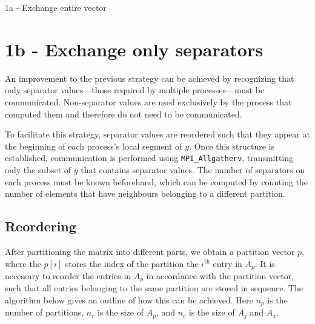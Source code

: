 \begin{algorithm}[H]
    \caption{1a - Exchange entire vector}
    \SetAlgoVlined


\end{algorithm}

\section{1b - Exchange only separators}

An improvement to the previous strategy can be achieved by recognizing that only separator values—those required by multiple processes—must be communicated. Non-separator values are used exclusively by the process that computed them and therefore do not need to be communicated.

To facilitate this strategy, separator values are reordered such that they appear at the beginning of each process's local segment of \(y\). Once this structure is established, communication is performed using \texttt{MPI\_Allgatherv}, transmitting only the subset of \(y\) that contains separator values. The number of separators on each process must be known beforehand, which can be computed by counting the number of elements that have neighbours belonging to a different partition.


\subsection{Reordering}
After partitioning the matrix into different parts, we obtain a partition vector \(p\), where the \(p[i]\) stores the index of the partition the \(i^{\text{th}}\) entry in \(A_{p}\). It is necessary to reorder the entries in \(A_{p}\) in accordance with the partition vector, such that all entries belonging to the same partition are stored in sequence. The algorithm below gives an outline of how this can be achieved. Here \(n_{p}\) is the number of partitions, \(n_{r}\) is the size of \(A_{p}\), and \(n_{c}\) is the size of \(A_{j}\) and \(A_{x}\).

